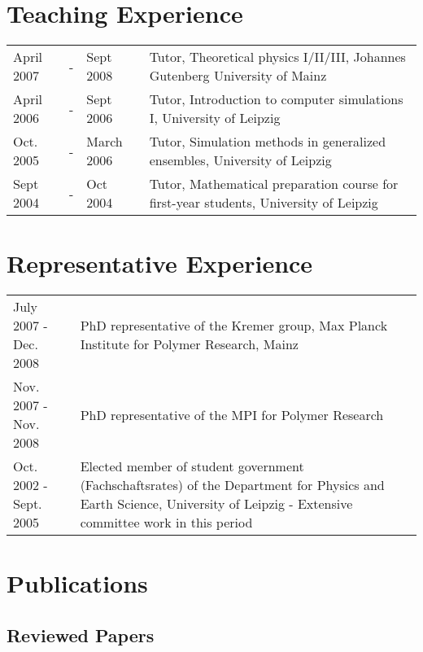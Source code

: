 \documentclass{article}
\begin{document}
\section*{Teaching Experience}

\begin{tabular}{lcll}
April 2007 &-& Sept 2008 & Tutor, Theoretical physics I/II/III, Johannes Gutenberg University of Mainz \\
April 2006 &-& Sept 2006 & Tutor, Introduction to computer simulations I, University of Leipzig \\
Oct. 2005 &-& March 2006 & Tutor, Simulation methods in generalized ensembles, University of Leipzig \\
Sept 2004 &-& Oct 2004 & Tutor, Mathematical preparation course for first-year students, University of Leipzig \\
\end{tabular}

\section*{Representative Experience}

\begin{tabular}{p{}p{}}
July 2007 - Dec. 2008 & PhD representative of the Kremer group, Max Planck Institute for Polymer Research, Mainz \\
Nov. 2007 - Nov. 2008 & PhD representative of the MPI for Polymer Research \\
Oct. 2002 - Sept. 2005 & Elected member of student government (Fachschaftsrates) of the Department for Physics and Earth Science, University of Leipzig - Extensive committee work in this period\\
\end{tabular}

\section*{Publications}

\subsection*{Reviewed Papers}
\end{document}
